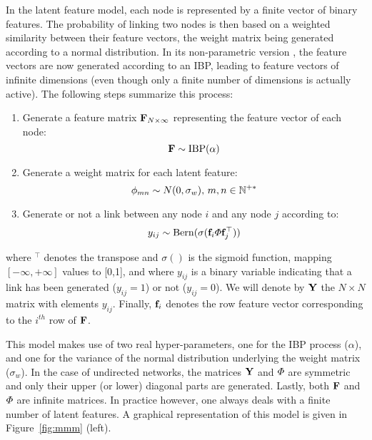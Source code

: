 In the latent feature model, each node is represented by a finite vector of binary features. The probability of linking two nodes is then based on a weighted similarity between their feature vectors, the weight matrix being generated according to a normal distribution. In its non-parametric version \ifm, the feature vectors are now generated according to an IBP, leading to feature vectors of infinite dimensions (even though only a finite number of dimensions is actually active). The following steps summarize this process:~\\
%
\begin{enumerate}
    \item Generate a feature matrix $\mathbf{F}_{N \times \infty}$ representing the feature vector of each node: \[\mathbf{F} \sim \mathrm{IBP}(\alpha)\]
\item Generate a weight matrix for each latent feature:\\
    \[\mathbf{\phi}_{mn} \sim N(0, \sigma_w), \, m,n \in \mathbb{N}^{+*}\]
\item Generate or not a link between any node $i$ and any node $j$ according to:
%
\begin{equation*}
y_{ij} \sim \mathrm{Bern}(\sigma(\mat{f}_{i} \mat{\Phi} \mat{f}_{j}^\top))
\end{equation*}
\end{enumerate}
%
where $^\top$ denotes the transpose and  $\sigma()$ is the sigmoid function, mapping $[-\infty, +\infty]$ values to [0,1], and where $y_{ij}$ is a binary variable indicating that a link has been generated ($y_{ij}=1$) or not ($y_{ij}=0$). We will denote by $\mathbf{Y}$ the $N \times N$ matrix with elements $y_{ij}$. Finally, $\mathbf{f}_{i}$ denotes the row feature vector corresponding to the $i^{th}$ row of $\mathbf{F}$.

This model makes use of two real hyper-parameters, one for the IBP process ($\alpha$), and one for the variance of the normal distribution underlying the weight matrix ($\sigma_w$). In the case of undirected networks, the matrices $\mathbf{Y}$ and $\mat{\Phi}$ are symmetric and only their upper (or lower) diagonal parts are generated. Lastly, both $\mathbf{F}$ and $\mat{\Phi}$ are infinite matrices. In practice however, one always deals with a finite number of latent features. A graphical representation of this model is given in Figure~\ref{fig:mmm} (left).~\\

